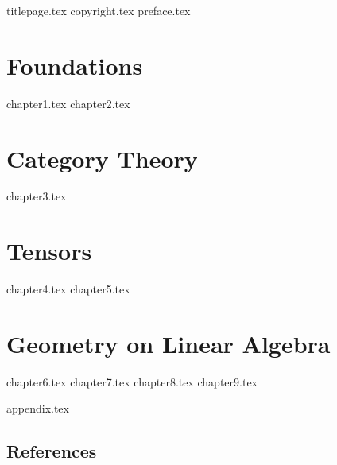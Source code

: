 \documentclass[noamsfonts]{amsbook}
\begin{document}
\frontmatter{}
{titlepage.tex}
{copyright.tex}
\tableofcontents{}
{preface.tex}

\mainmatter{}
\part{Foundations}
{chapter1.tex}
{chapter2.tex}
\part{Category Theory}
{chapter3.tex}
\part{Tensors}
{chapter4.tex}
{chapter5.tex}
\part{Geometry on Linear Algebra}
{chapter6.tex}
{chapter7.tex}
{chapter8.tex}
{chapter9.tex}

\backmatter{}
{appendix.tex}

\chapter*{References}
\printbibliography[heading=none, type=online]
\end{document}
